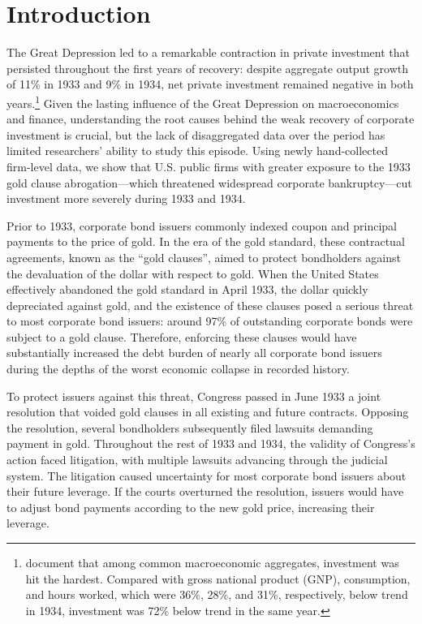 \section{Introduction}
\label{sec:intro}

\noindent The Great Depression led to a remarkable contraction in private investment that persisted throughout the first years of recovery: despite aggregate output growth of 11\% in 1933 and 9\% in 1934, net private investment remained negative in both years.\footnote{\cite{Cole2004} document that among common macroeconomic aggregates, investment was hit the hardest. Compared with gross national product (GNP), consumption, and hours worked, which were 36\%, 28\%, and 31\%, respectively, below trend in 1934, investment was 72\% below trend in the same year.} Given the lasting influence of the Great Depression on macroeconomics and finance, understanding the root causes behind the weak recovery of corporate investment is crucial, but the lack of disaggregated data over the period has limited researchers' ability to study this episode. Using newly hand-collected firm-level data, we show that U.S. public firms with greater exposure to the 1933 gold clause abrogation---which threatened widespread corporate bankruptcy---cut investment more severely during 1933 and 1934.

Prior to 1933, corporate bond issuers commonly indexed coupon and principal payments to the price of gold. In the era of the gold standard, these contractual agreements, known as the ``gold clauses'', aimed to protect bondholders against the devaluation of the dollar with respect to gold. When the United States effectively abandoned the gold standard in April 1933, the dollar quickly depreciated against gold, and the existence of these clauses posed a serious threat to most corporate bond issuers: around 97\% of outstanding corporate bonds were subject to a gold clause. Therefore, enforcing these clauses would have substantially increased the debt burden of nearly all corporate bond issuers during the depths of the worst economic collapse in recorded history.

To protect issuers against this threat, Congress passed in June 1933 a joint resolution that voided gold clauses in all existing and future contracts. Opposing the resolution, several bondholders subsequently filed lawsuits demanding payment in gold. Throughout the rest of 1933 and 1934, the validity of Congress's action faced litigation, with multiple lawsuits advancing through the judicial system. The litigation caused uncertainty for most corporate bond issuers about their future leverage. If the courts overturned the resolution, issuers would have to adjust bond payments according to the new gold price, increasing their leverage.

